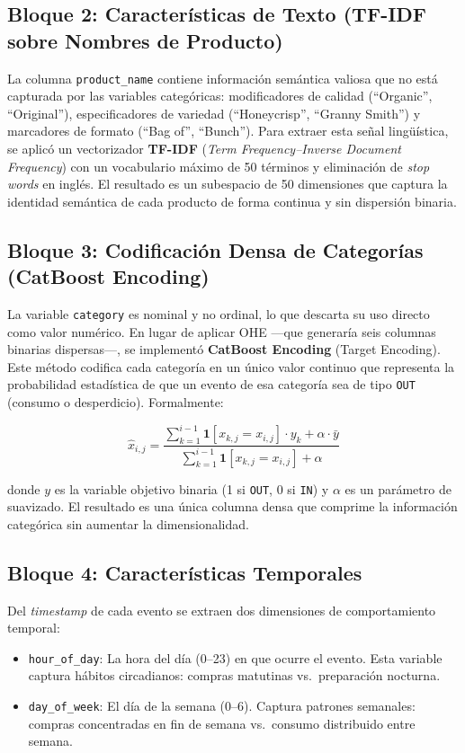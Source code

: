 \documentclass[12pt,a4paper]{article}
\newcommand{\code}[1]{\texttt{\small #1}}
\begin{document}
\subsection{Bloque 2: Características de Texto (TF-IDF sobre Nombres de Producto)}

La columna \code{product\_name} contiene información semántica valiosa que no está capturada por las variables categóricas: modificadores de calidad (``Organic'', ``Original''), especificadores de variedad (``Honeycrisp'', ``Granny Smith'') y marcadores de formato (``Bag of'', ``Bunch''). Para extraer esta señal lingüística, se aplicó un vectorizador \textbf{TF-IDF} (\textit{Term Frequency–Inverse Document Frequency}) con un vocabulario máximo de 50 términos y eliminación de \textit{stop words} en inglés. El resultado es un subespacio de 50 dimensiones que captura la identidad semántica de cada producto de forma continua y sin dispersión binaria.

\subsection{Bloque 3: Codificación Densa de Categorías (CatBoost Encoding)}

La variable \code{category} es nominal y no ordinal, lo que descarta su uso directo como valor numérico. En lugar de aplicar OHE —que generaría seis columnas binarias dispersas—, se implementó \textbf{CatBoost Encoding} (Target Encoding). Este método codifica cada categoría en un único valor continuo que representa la probabilidad estadística de que un evento de esa categoría sea de tipo \code{OUT} (consumo o desperdicio). Formalmente:

\[
\hat{x}_{i,j} = \frac{\sum_{k=1}^{i-1} \mathbf{1}[x_{k,j} = x_{i,j}] \cdot y_k + \alpha \cdot \bar{y}}{\sum_{k=1}^{i-1} \mathbf{1}[x_{k,j} = x_{i,j}] + \alpha}
\]

donde $y$ es la variable objetivo binaria (1 si \code{OUT}, 0 si \code{IN}) y $\alpha$ es un parámetro de suavizado. El resultado es una única columna densa que comprime la información categórica sin aumentar la dimensionalidad.

\subsection{Bloque 4: Características Temporales}

Del \textit{timestamp} de cada evento se extraen dos dimensiones de comportamiento temporal:
\begin{itemize}
    \item \code{hour\_of\_day}: La hora del día (0--23) en que ocurre el evento. Esta variable captura hábitos circadianos: compras matutinas vs.\ preparación nocturna.
    \item \code{day\_of\_week}: El día de la semana (0--6). Captura patrones semanales: compras concentradas en fin de semana vs.\ consumo distribuido entre semana.
\end{itemize}
\end{document}
